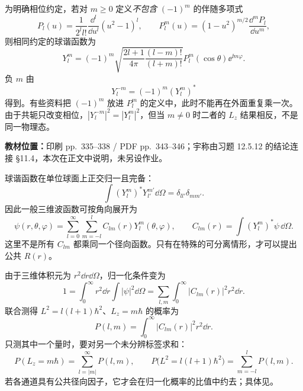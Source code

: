 为明确相位约定，若对 $m\geq0$ 定义\emph{不包含} $(-1)^m$ 的伴随多项式
\begin{equation}
  P_l(u)=\frac1{2^ll!}\frac{\dd^l}{\dd u^l}(u^2-1)^l,
  \qquad P_l^m(u)=(1-u^2)^{m/2}\frac{\dd^mP_l}{\dd u^m},
\end{equation}
则相同约定的球谐函数为
\begin{equation}
  Y_l^m=(-1)^m\sqrt{\frac{2l+1}{4\pi}\frac{(l-m)!}{(l+m)!}}
    P_l^m(\cos\theta)\ee^{\ii m\varphi}.
\end{equation}
负 $m$ 由
\begin{equation}
  \boxed{Y_l^{-m}=(-1)^m(Y_l^m)^*}
\end{equation}
得到。有些资料把 $(-1)^m$ 放进 $P_l^m$ 的定义中，此时不能再在外面重复乘一次。由于共轭只改变相位，$|Y_l^{-m}|^2=|Y_l^m|^2$，但当 $m\ne0$ 时二者的 $L_z$ 结果相反，不是同一物理态。

\textbf{教材位置：}印刷 pp.~335--338 / PDF pp.~343--346；宇称由习题 12.5.12 的结论连接 \S 11.4，本次在正文中说明，未另设作业。

球谐函数在单位球面上正交归一且完备：
\begin{equation}
  \int (Y_l^m)^*Y_{l'}^{m'}\dd\Omega
    =\delta_{ll'}\delta_{mm'}.
\end{equation}
因此一般三维波函数可按角向展开为
\begin{equation}
  \boxed{\psi(r,\theta,\varphi)
    =\sum_{l=0}^\infty\sum_{m=-l}^l C_{lm}(r)Y_l^m(\theta,\varphi),}
  \qquad C_{lm}(r)=\int (Y_l^m)^*\psi\,\dd\Omega.
  \label{eq:QM-C12-S05-expansion}
\end{equation}
这里不是所有 $C_{lm}$ 都乘同一个径向函数。只有在特殊的可分离情形，才可以提出公共 $R(r)$。

由于三维体积元为 $r^2\dd r\dd\Omega$，归一化条件变为
\begin{equation}
  1=\int_0^\infty r^2\dd r\int|\psi|^2\dd\Omega
   =\sum_{l,m}\int_0^\infty|C_{lm}(r)|^2r^2\dd r.
\end{equation}
联合测得 $L^2=l(l+1)\hbar^2$、$L_z=m\hbar$ 的概率为
\begin{equation}
  \boxed{P(l,m)=\int_0^\infty|C_{lm}(r)|^2r^2\dd r.}
\end{equation}
只测其中一个量时，要对另一个未分辨标签求和：
\begin{equation}
  P(L_z=m\hbar)=\sum_{l=|m|}^\infty P(l,m),\qquad
  P\bigl(L^2=l(l+1)\hbar^2\bigr)=\sum_{m=-l}^lP(l,m).
\end{equation}
若各通道具有公共径向因子，它才会在归一化概率的比值中约去；具体见。


